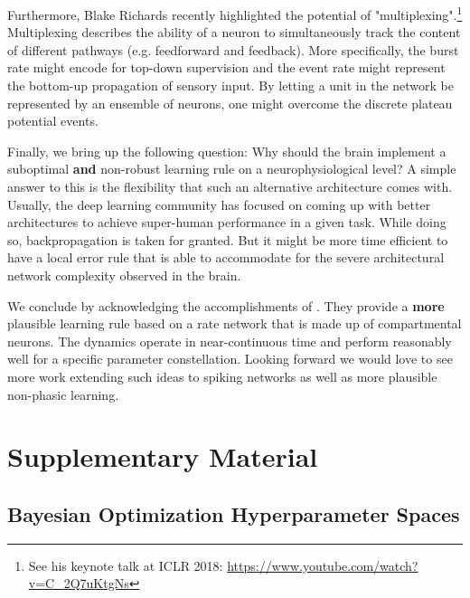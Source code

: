 \documentclass[colorinlistoftodos]{article}
\theoremstyle{definition}
\begin{document}
Furthermore, Blake Richards recently highlighted the potential of "multiplexing".\footnote{See his keynote talk at ICLR 2018: \url{https://www.youtube.com/watch?v=C_2Q7uKtgNs}} Multiplexing \citep{naud_2018} describes the ability of a neuron to simultaneously track the content of different pathways (e.g. feedforward and feedback). More specifically, the burst rate might encode for top-down supervision and the event rate might represent the bottom-up propagation of sensory input. By letting a unit in the network be represented by an ensemble of neurons, one might overcome the discrete plateau potential events.

Finally, we bring up the following question: Why should the brain implement a suboptimal \textbf{and} non-robust learning rule on a neurophysiological level? A simple answer to this is the flexibility that such an alternative architecture comes with. 
Usually, the deep learning community has focused on coming up with better architectures to achieve super-human performance in a given task. While doing so, backpropagation is taken for granted. But it might be more time efficient to have a local error rule that is able to accommodate for the severe architectural network complexity observed in the brain.

We conclude by acknowledging the accomplishments of \citet{guerguiev2017}. They provide a \textbf{more} plausible learning rule based on a rate network that is made up of compartmental neurons. The dynamics operate in near-continuous time and perform reasonably well for a specific parameter constellation. Looking forward we would love to see more work extending such ideas to spiking networks as well as more plausible non-phasic learning. 

\setlength{\bibsep}{4pt plus 0.3ex}

{\footnotesize }

\section*{Supplementary Material}

\subsection*{Bayesian Optimization Hyperparameter Spaces}
\end{document}
